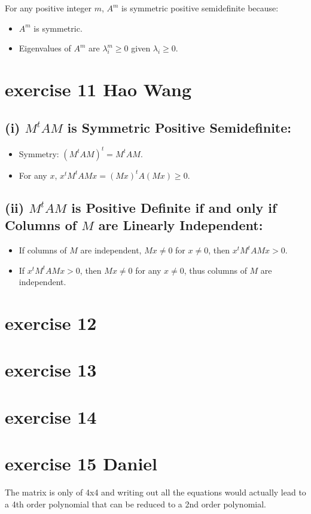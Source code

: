 \documentclass{article}
\begin{document}
For any positive integer \(m\), \(A^m\) is symmetric positive semidefinite because:
\begin{itemize}
    \item \(A^m\) is symmetric.
    \item Eigenvalues of \(A^m\) are \(\lambda_i^m \geq 0\) given \(\lambda_i \geq 0\).
\end{itemize}


\section{exercise 11 Hao Wang}

\subsection*{(i) \(M^t A M\) is Symmetric Positive Semidefinite:}

\begin{itemize}
    \item Symmetry: \((M^t A M)^t = M^t A M\).
    \item For any \(x\), \(x^t M^t A M x = (Mx)^t A (M x) \geq 0\).
\end{itemize}

\subsection*{(ii) \(M^t A M\) is Positive Definite if and only if Columns of \(M\) are Linearly Independent:}

\begin{itemize}
    \item If columns of \(M\) are independent, \(M x \neq 0\)  for \(x \neq 0\), then \(x^t M^t A M x > 0\).
    \item If \(x^t M^t A M x > 0\), then \(M x \neq 0\) for any \(x \neq 0\), thus columns of \(M\) are independent.
\end{itemize}

\section{exercise 12}
\section{exercise 13}
\section{exercise 14}
\section{exercise 15 Daniel}
The matrix is only of 4x4 and writing out all the equations would actually lead to a 4th order polynomial that can be reduced to a 2nd order polynomial.
\end{document}
